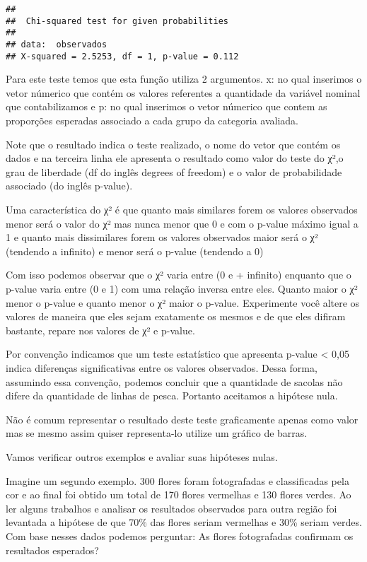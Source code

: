 \documentclass[]{book}
\begin{document}
\begin{verbatim}
## 
##  Chi-squared test for given probabilities
## 
## data:  observados
## X-squared = 2.5253, df = 1, p-value = 0.112
\end{verbatim}

Para este teste temos que esta função utiliza 2 argumentos. x: no qual inserimos o vetor númerico que contém os valores referentes a quantidade da variável nominal que contabilizamos e p: no qual inserimos o vetor númerico que contem as proporções esperadas associado a cada grupo da categoria avaliada.

Note que o resultado indica o teste realizado, o nome do vetor que contém os dados e na terceira linha ele apresenta o resultado como valor do teste do χ²,o grau de liberdade (df do inglês degrees of freedom) e o valor de probabilidade associado (do inglês p-value).

Uma característica do χ² é que quanto mais similares forem os valores observados menor será o valor do χ² mas nunca menor que 0 e com o p-value máximo igual a 1 e quanto mais dissimilares forem os valores observados maior será o χ² (tendendo a infinito) e menor será o p-value (tendendo a 0)

Com isso podemos observar que o χ² varia entre (0 e + infinito) enquanto que o p-value varia entre (0 e 1) com uma relação inversa entre eles. Quanto maior o χ² menor o p-value e quanto menor o χ² maior o p-value. Experimente você altere os valores de maneira que eles sejam exatamente os mesmos e de que eles difiram bastante, repare nos valores de χ² e p-value.

Por convenção indicamos que um teste estatístico que apresenta p-value \textless{} 0,05 indica diferenças significativas entre os valores observados. Dessa forma, assumindo essa convenção, podemos concluir que a quantidade de sacolas não difere da quantidade de linhas de pesca. Portanto aceitamos a hipótese nula.

Não é comum representar o resultado deste teste graficamente apenas como valor mas se mesmo assim quiser representa-lo utilize um gráfico de barras.

Vamos verificar outros exemplos e avaliar suas hipóteses nulas.

Imagine um segundo exemplo. 300 flores foram fotografadas e classificadas pela cor e ao final foi obtido um total de 170 flores vermelhas e 130 flores verdes. Ao ler alguns trabalhos e analisar os resultados observados para outra região foi levantada a hipótese de que 70\% das flores seriam vermelhas e 30\% seriam verdes. Com base nesses dados podemos perguntar: As flores fotografadas confirmam os resultados esperados?
\end{document}
